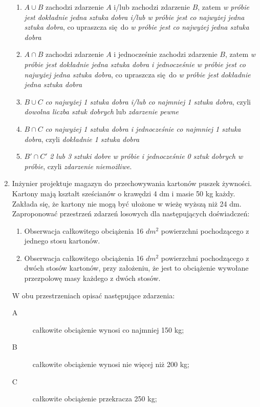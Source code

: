 \documentclass[twoside]{mwart}
\newcommand{\ans}[1]{}
\newcommand{\ans}[1]{\par\emph{Odpowiedź:} #1}
\begin{document}
\begin{enumerate}
{\begin{enumerate}
\begin{itemize}
		\end{itemize}
		\item $A\cup B$ zachodzi zdarzenie $A$ i/lub zachodzi zdarzenie $B$, zatem \emph{w próbie jest dokładnie jedna sztuka dobra i/lub w próbie jest co najwyżej jedna sztuka dobra}, co upraszcza się do \emph{w próbie jest co najwyżej jedna sztuka dobra}
		\item $A\cap B$ zachodzi zdarzenie $A$ i jednocześnie zachodzi zdarzenie $B$, zatem \emph{w próbie jest dokładnie jedna sztuka dobra i jednocześnie w próbie jest co najwyżej jedna sztuka dobra}, co upraszcza się do \emph{w próbie jest dokładnie jedna sztuka dobra}
		\item $B\cup C$ \emph{co najwyżej 1 sztuka dobra i/lub co najmniej 1 sztuka dobra}, czyli \emph{dowolna liczba sztuk dobrych} lub \emph{zdarzenie pewne}
		\item $B\cap C$ \emph{co najwyżej 1 sztuka dobra i jednocześnie co najmniej 1 sztuka dobra}, czyli \emph{dokładnie 1 sztuka dobra}
		\item $B'\cap C'$ \emph{2 lub 3 sztuki dobre w próbie i jednocześnie 0 sztuk dobrych w próbie}, czyli \emph{zdarzenie niemożliwe}.
	\end{enumerate}
}
\item Inżynier projektuje magazyn do przechowywania kartonów puszek żywności. Kartony mają kształt sześcianów o krawędzi 4 dm i masie 50 kg każdy. Zakłada się, że kartony nie mogą być ułożone w wieżę wyższą niż 24 dm. Zaproponować przestrzeń zdarzeń losowych dla następujących doświadczeń:
\begin{enumerate}
\item Obserwacja całkowitego obciążenia 16 $dm^2$ powierzchni pochodzącego z jednego stosu kartonów.
\item Obserwacja całkowitego obciążenia 16 $dm^2$ powierzchni pochodzącego z dwóch stosów kartonów, przy założeniu, że jest to obciążenie wywołane przezpolowę masy każdego z dwóch stosów.
\end{enumerate}
W obu przestrzeniach opisać następujące zdarzenia:
\begin{description}
\item[A] całkowite obciążenie wynosi co najmniej 150 kg;
\item[B] całkowite obciążenie wynosi nie więcej niż 200 kg;
\item[C] całkowite obciążenie przekracza 250 kg;
\end{description}
\ans{
	Istnieje wiele możliwych rozwiązań, poniżej zaprezentowane są przykłady. Kryterium jest takie: w danej przestrzeni zdarzeń elementarnych musi dać się opisać jako jej podzbiory zdarzenia $A$, $B$, $C$ i dla danej obserwacji stosu/stosów kartonów musi dać się przypisać dokładnie jedno zdarzenie elementarne (ale może być tak że wielu obserwacjom przypisujemy to samo zdarzenie elementarne).
}
\end{enumerate}
\end{document}
